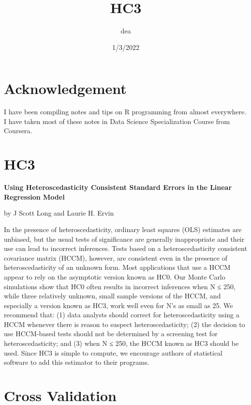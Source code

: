 \documentclass[
]{book}
\title{HC3}
\author{dea}
\date{1/3/2022}
\begin{document}
\maketitle

{
\setcounter{tocdepth}{1}
\tableofcontents
}
\hypertarget{acknowledgement}{%
\chapter{Acknowledgement}\label{acknowledgement}}

I have been compiling notes and tips on R programming from almost everywhere. I have taken most of these notes in Data Science Specialization Course from Coursera.

\hypertarget{hc3}{%
\chapter{HC3}\label{hc3}}

\textbf{Using Heteroscedasticity Consistent Standard Errors in the Linear Regression Model}

by J Scott Long and Laurie H. Ervin

In the presence of heteroscedasticity, ordinary least squares (OLS) estimates are unbiased, but the usual tests of significance are generally inappropriate and their use can lead to incorrect inferences. Tests based on a heteroscedasticity consistent covariance matrix (HCCM), however, are consistent even in the presence of heteroscedasticity of an unknown form. Most applications that use a HCCM appear to rely on the asymptotic version known as HC0. Our Monte Carlo simulations show that HC0 often results in incorrect inferences when N ≤ 250, while three relatively unknown, small sample versions of the HCCM, and especially a version known as HC3, work well even for N's as small as 25. We recommend that: (1) data analysts should correct for heteroscedasticity using a HCCM whenever there is reason to suspect heteroscedasticity; (2) the decision to use HCCM-based tests should not be determined by a screening test for heteroscedasticity; and (3) when N ≤ 250, the HCCM known as HC3 should be used. Since HC3 is simple to compute, we encourage authors of statistical software to add this estimator to their programs.

\hypertarget{cross-validation}{%
\chapter{Cross Validation}\label{cross-validation}}
\end{document}
